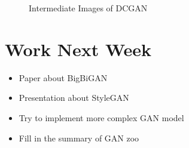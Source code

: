 \documentclass{article} %
\begin{document}
\begin{figure}[htbp]
\centering
{}%
%
\centering
\caption{Intermediate Images of DCGAN}
\label{fig:DCGANIntermediate}
\end{figure}

\section{Work Next Week}

\begin{itemize}
    \item Paper about BigBiGAN
    \item Presentation about StyleGAN
    \item Try to implement more complex GAN model
    \item Fill in the summary of GAN zoo
\end{itemize}
\end{document}

